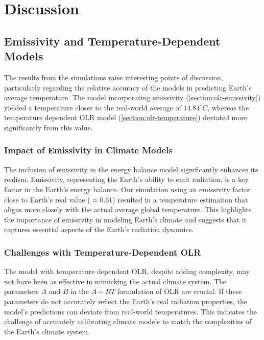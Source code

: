 \documentclass[12pt]{article}
\begin{document}
\section{Discussion}

\subsection{Emissivity and Temperature-Dependent Models}

The results from the simulations raise interesting points of discussion, particularly regarding the relative accuracy of the models in predicting Earth's average temperature. The model incorporating emissivity (\ref{section:olr-emissivity}) yielded a temperature closer to the real-world average of ${14.84}^\circ C$, whereas the temperature dependent OLR model (\ref{section:olr-temperature}) deviated more significantly from this value.

\subsubsection{Impact of Emissivity in Climate Models}
The inclusion of emissivity in the energy balance model significantly enhances its realism. Emissivity, representing the Earth's ability to emit radiation, is a key factor in the Earth's energy balance. Our simulation using an emissivity factor close to Earth's real value ($\approx 0.61$) resulted in a temperature estimation that aligns more closely with the actual average global temperature. This highlights the importance of emissivity in modeling Earth's climate and suggests that it captures essential aspects of the Earth's radiation dynamics.

\subsubsection{Challenges with Temperature-Dependent OLR}
The model with temperature dependent OLR, despite adding complexity, may not have been as effective in mimicking the actual climate system. The parameters \( A \) and \( B \) in the \( A + BT \) formulation of OLR are crucial. If these parameters do not accurately reflect the Earth's real radiation properties, the model's predictions can deviate from real-world temperatures. This indicates the challenge of accurately calibrating climate models to match the complexities of the Earth's climate system.
\end{document}
